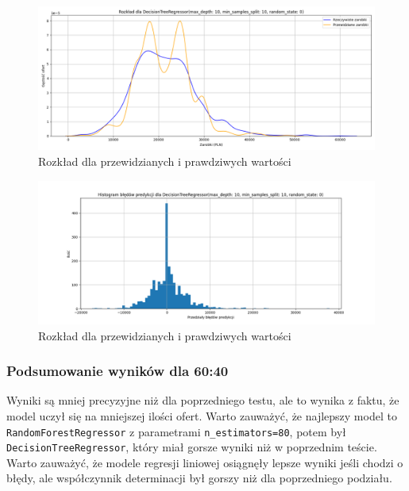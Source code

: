 \documentclass[a4paper]{article}
\begin{document}
\begin{figure}[H]
    \centering
    \includegraphics[width=\textwidth]{../analysis/plots/wyniki/0.6&0.4/DecisionTreeRegressor/salary_dist.png}
    \caption{Rozkład dla przewidzianych i prawdziwych wartości}
\end{figure}

\begin{figure}[H]
    \centering
    \includegraphics[width=\textwidth]{../analysis/plots/wyniki/0.6&0.4/DecisionTreeRegressor/errors.png}
    \caption{Rozkład dla przewidzianych i prawdziwych wartości}
\end{figure}

\subsubsection{Podsumowanie wyników dla 60:40}


\quad Wyniki są mniej precyzyjne niż dla poprzedniego testu, ale to wynika z faktu, że model uczył się na mniejszej
ilości ofert. Warto zauważyć, że najlepszy model to \texttt{RandomForestRegressor} z parametrami \texttt{n\_estimators=80},
potem był \texttt{DecisionTreeRegressor}, który miał gorsze wyniki niż w poprzednim teście. Warto zauważyć, że modele regresji liniowej osiągnęły lepsze wyniki jeśli chodzi o błędy, ale współczynnik determinacji był gorszy niż dla poprzedniego podziału.
\end{document}
